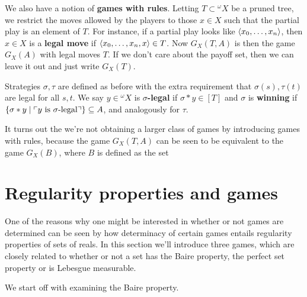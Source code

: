 \qquad We also have a notion of \textbf{games with rules}. Letting $T\subset{^\omega X}$ be a pruned tree, we restrict the moves allowed by the players to those $x\in X$ such that the partial play is an element of $T$. For instance, if a partial play looks like $\langle x_0,\hdots,x_n\rangle$, then $x\in X$ is a \textbf{legal move} if $\langle x_0,\hdots,x_n,x\rangle\in T$. Now $G_X(T,A)$ is then the game $G_X(A)$ with legal moves $T$. If we don't care about the payoff set, then we can leave it out and just write $G_X(T)$.

\qquad Strategies $\sigma,\tau$ are defined as before with the extra requirement that $\sigma(s),\tau(t)$ are legal for all $s,t$. We say $y\in{^\omega X}$ is \textbf{$\sigma$-legal} if $\sigma*y\in[T]$ and $\sigma$ is \textbf{winning} if $\{\sigma*y\mid\ulcorner y\text{ is $\sigma$-legal} \urcorner\}\subseteq A$, and analogously for $\tau$. 

\qquad It turns out the we're not obtaining a larger class of games by introducing games with rules, because the game $G_X(T,A)$ can be seen to be equivalent to the game $G_X(B)$, where $B$ is defined as the set

\section{Regularity properties and games}

One of the reasons why one might be interested in whether or not games are determined can be seen by how determinacy of certain games entails regularity properties of sets of reals. In this section we'll introduce three games, which are closely related to whether or not a set has the Baire property, the perfect set property or is Lebesgue measurable.

\qquad We start off with examining the Baire property.


